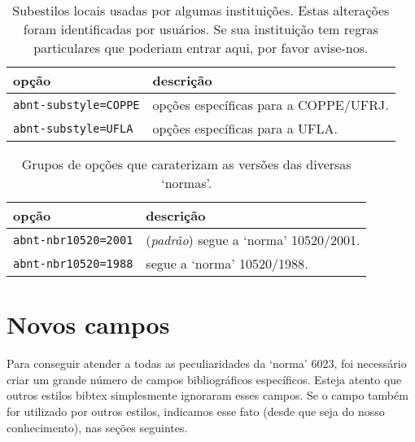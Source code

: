 \documentclass[a4paper]{ltxdoc}
\begin{document}
\begin{table}[htbp]

\caption[Subestilos de diversas instituições]{
Subestilos locais usadas por algumas instituições. Estas alterações
foram identificadas por usuários. Se sua instituição
tem regras particulares que poderiam entrar aqui, por favor avise-nos.}
\label{tabela-subestilos}

\begin{center}
\begin{tabular}{lp{8cm}}
	\toprule
opção  & descrição \\ \midrule
\texttt{abnt-substyle=COPPE} & opções específicas para a COPPE/UFRJ.\\
\texttt{abnt-substyle=UFLA} & opções específicas para a UFLA.\\
\bottomrule
\end{tabular}
\end{center}
\end{table}



\begin{table}[htbp]

\caption[Versão das `normas' a ser usada]{
Grupos de opções que caraterizam as versões das diversas `normas'.}
\label{tabela-versao-normas}

\begin{center}
\begin{tabular}{lp{8cm}}\hline\hline
opção & descrição \\ \hline
\texttt{abnt-nbr10520=2001} & (\emph{padrão}) segue a `norma' 10520/2001\cite{NBR10520:2001}.\\
\texttt{abnt-nbr10520=1988} & segue a `norma' 10520/1988\cite{NBR10520:1988}.\\
\bottomrule
\end{tabular}
\end{center}
\end{table}


\section{Novos campos}

Para conseguir atender a todas as peculiaridades da `norma'
6023\cite{NBR6023:2000}, foi necessário criar um grande número de campos
bibliográficos específicos. Esteja atento que outros estilos \textsf{bibtex}
simplesmente ignoraram esses campos. Se o campo também for utilizado por outros
estilos, indicamos esse fato (desde que seja do nosso conhecimento), nas seções
seguintes.
\end{document}
